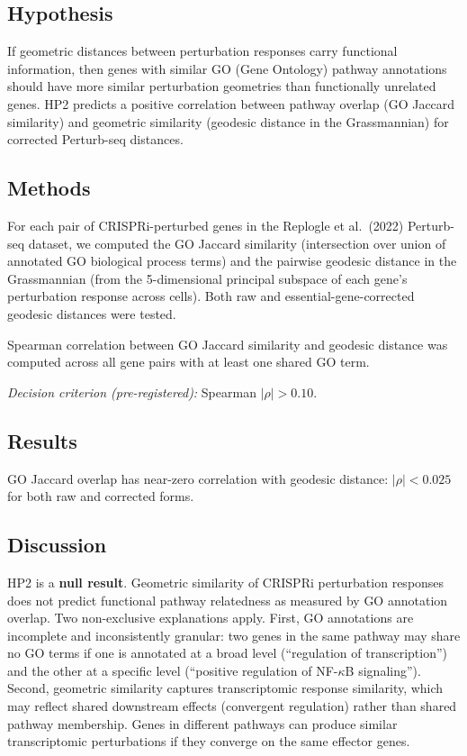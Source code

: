\documentclass[11pt]{article}
\begin{document}
\subsection{Hypothesis}

If geometric distances between perturbation responses carry functional
information, then genes with similar GO (Gene Ontology) pathway
annotations should have more similar perturbation geometries than
functionally unrelated genes.  HP2 predicts a positive correlation
between pathway overlap (GO Jaccard similarity) and geometric similarity
(geodesic distance in the Grassmannian) for corrected Perturb-seq
distances.

\subsection{Methods}

For each pair of CRISPRi-perturbed genes in the Replogle et al.\ (2022)
Perturb-seq dataset, we computed the GO Jaccard similarity (intersection
over union of annotated GO biological process terms) and the pairwise
geodesic distance in the Grassmannian (from the 5-dimensional principal
subspace of each gene's perturbation response across cells).  Both raw
and essential-gene-corrected geodesic distances were tested.

Spearman correlation between GO Jaccard similarity and geodesic distance
was computed across all gene pairs with at least one shared GO term.

\emph{Decision criterion (pre-registered):} Spearman $|\rho| > 0.10$.

\subsection{Results}

GO Jaccard overlap has near-zero correlation with geodesic distance:
$|\rho| < 0.025$ for both raw and corrected forms.

\subsection{Discussion}

HP2 is a \textbf{null result}.  Geometric similarity of CRISPRi
perturbation responses does not predict functional pathway relatedness
as measured by GO annotation overlap.  Two non-exclusive explanations
apply.  First, GO annotations are incomplete and inconsistently granular:
two genes in the same pathway may share no GO terms if one is annotated
at a broad level (``regulation of transcription'') and the other at a
specific level (``positive regulation of NF-$\kappa$B signaling'').
Second, geometric similarity captures transcriptomic response similarity,
which may reflect shared downstream effects (convergent regulation) rather
than shared pathway membership.  Genes in different pathways can produce
similar transcriptomic perturbations if they converge on the same
effector genes.
\end{document}
